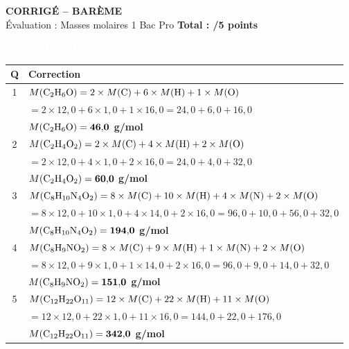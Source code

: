 \documentclass[11pt,a4paper]{article}
\newcommand{\exotitle}[2]{%
  \noindent\colorbox{exoheader}{%
    \parbox{\dimexpr\linewidth-2\fboxsep\relax}{%
      \textcolor{white}{\textbf{\large #1 \hfill #2}}%
    }%
  }%
}
\begin{document}
\begin{center}
  {\LARGE\textbf{CORRIGÉ -- BARÈME}}\\[2mm]
  {\large Évaluation : Masses molaires \hspace{1cm} 1 Bac Pro \hspace{1cm} \textbf{Total : /5 points}}
\end{center}

\vspace{4mm}

\exotitle{Corrigé détaillé}{~}

\vspace{2mm}

\begin{tabularx}{\linewidth}{|c|X|}
\hline
\rowcolor{exolight}
\textbf{Q} & \textbf{Correction} \\
\hline
1 &
$M(\ce{C2H6O}) = 2 \times M(\text{C}) + 6 \times M(\text{H}) + 1 \times M(\text{O})$\\
& $= 2 \times 12{,}0 + 6 \times 1{,}0 + 1 \times 16{,}0 = 24{,}0 + 6{,}0 + 16{,}0$\\
& \hspace{2cm}\textbf{$M(\ce{C2H6O}) = \mathbf{46{,}0}$ g/mol} \\
\hline
2 &
$M(\ce{C2H4O2}) = 2 \times M(\text{C}) + 4 \times M(\text{H}) + 2 \times M(\text{O})$\\
& $= 2 \times 12{,}0 + 4 \times 1{,}0 + 2 \times 16{,}0 = 24{,}0 + 4{,}0 + 32{,}0$\\
& \hspace{2cm}\textbf{$M(\ce{C2H4O2}) = \mathbf{60{,}0}$ g/mol} \\
\hline
3 &
$M(\ce{C8H10N4O2}) = 8 \times M(\text{C}) + 10 \times M(\text{H}) + 4 \times M(\text{N}) + 2 \times M(\text{O})$\\
& $= 8 \times 12{,}0 + 10 \times 1{,}0 + 4 \times 14{,}0 + 2 \times 16{,}0 = 96{,}0 + 10{,}0 + 56{,}0 + 32{,}0$\\
& \hspace{2cm}\textbf{$M(\ce{C8H10N4O2}) = \mathbf{194{,}0}$ g/mol} \\
\hline
4 &
$M(\ce{C8H9NO2}) = 8 \times M(\text{C}) + 9 \times M(\text{H}) + 1 \times M(\text{N}) + 2 \times M(\text{O})$\\
& $= 8 \times 12{,}0 + 9 \times 1{,}0 + 1 \times 14{,}0 + 2 \times 16{,}0 = 96{,}0 + 9{,}0 + 14{,}0 + 32{,}0$\\
& \hspace{2cm}\textbf{$M(\ce{C8H9NO2}) = \mathbf{151{,}0}$ g/mol} \\
\hline
5 &
$M(\ce{C12H22O11}) = 12 \times M(\text{C}) + 22 \times M(\text{H}) + 11 \times M(\text{O})$\\
& $= 12 \times 12{,}0 + 22 \times 1{,}0 + 11 \times 16{,}0 = 144{,}0 + 22{,}0 + 176{,}0$\\
& \hspace{2cm}\textbf{$M(\ce{C12H22O11}) = \mathbf{342{,}0}$ g/mol} \\
\hline
\end{tabularx}
\end{document}
